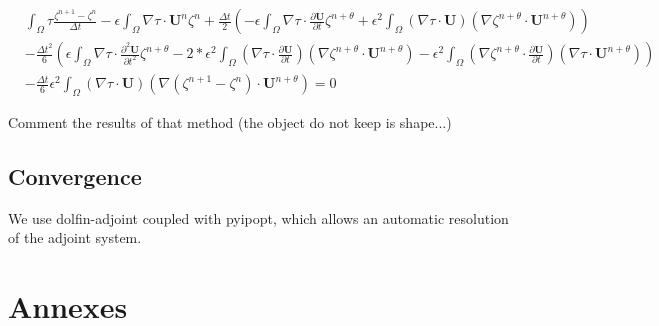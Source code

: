 \documentclass[11pt,a4paper]{article}
\begin{document}
					\begin{align*}
						& \displaystyle \int_{\Omega}{\! \tau \frac{\zeta^{n+1} - \zeta^n}{\Delta t}}  -   \epsilon \int_{\Omega}{\! \nabla \tau \cdot  \mathbf{U}^n  \zeta^n} + \frac{\Delta t}{2}\left( - \epsilon \int_{\Omega}{\! \nabla \tau \cdot \frac{\partial \mathbf{U}}{\partial t} \zeta^{n+\theta}}
						 +  \epsilon^2 \int_{\Omega}{\! (\nabla \tau \cdot \mathbf{U})(\nabla \zeta^{n+\theta} \cdot \mathbf{U}^{n+\theta})}\right) \\
						 & -\frac{\Delta t^2}{6}\left(\epsilon \int_{\Omega}{\! \nabla \tau \cdot \frac{\partial^2 \mathbf{U}}{\partial t^2} \zeta^{n+\theta}} -2*\epsilon^2 \int_{\Omega}{\! (\nabla \tau \cdot \frac{\partial \mathbf{U}}{\partial t})(\nabla \zeta^{n+\theta} \cdot \mathbf{U}^{n+\theta})} -\epsilon^2 \int_{\Omega}{\! (\nabla \zeta^{n+\theta} \cdot \frac{\partial \mathbf{U}}{\partial t})(\nabla \tau \cdot \mathbf{U}^{n+\theta})}\right) \\
						 & -\frac{\Delta t}{6} \epsilon^2 \int_{\Omega}{\! (\nabla \tau \cdot \mathbf{U})(\nabla (\zeta^{n+1} -  \zeta^n) \cdot \mathbf{U}^{n+\theta})}  = 0
					\end{align*}
					
					Comment the results of that method (the object do not keep is shape...)
					
				\subsection{Convergence}
					We use dolfin-adjoint coupled with pyipopt, which allows an automatic resolution of the adjoint system.
					
					
					
					
		
	
		\pagebreak	
	
	\section*{Annexes}
		
		\pagebreak
		
		 
		
		
		\appendix
\end{document}
